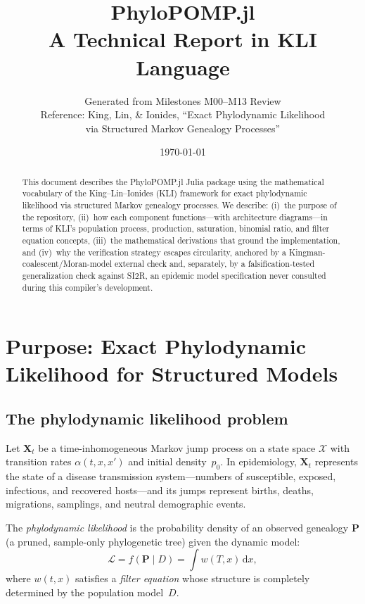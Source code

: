 \documentclass[11pt,leqno]{article}
\title{\vspace{-1.5cm}
  \textbf{PhyloPOMP.jl} \\[4pt]
  \large A Technical Report in KLI Language}
\author{Generated from Milestones M00--M13 Review \\[2pt]
  \small Reference: King, Lin, \& Ionides,
  ``Exact Phylodynamic Likelihood \\
  \small via Structured Markov Genealogy Processes''}
\date{\today}
\newcommand{\Xr}{\mathbf{X}}        %
\renewcommand{\Pr}{\mathbf{P}}      %
\newcommand{\Xspace}{\mathcal{X}}   %
\newcommand{\dd}[1]{\,\mathrm{d}{#1}}
\newcommand{\lik}{\mathcal{L}}      %
\newcommand{\pkg}[1]{\textsf{#1}}
\theoremstyle{plain}
\theoremstyle{definition}
\begin{document}
\maketitle

\begin{abstract}
This document describes the \pkg{PhyloPOMP.jl} Julia package using the
mathematical vocabulary of the King--Lin--Ionides (KLI) framework for exact
phylodynamic likelihood via structured Markov genealogy processes.
We describe:
(i)~the purpose of the repository,
(ii)~how each component functions---with architecture diagrams---in terms of
KLI's population process, production, saturation, binomial ratio, and filter
equation concepts,
(iii)~the mathematical derivations that ground the implementation, and
(iv)~why the verification strategy escapes circularity, anchored by a
Kingman-coalescent/Moran-model external check and, separately, by a
falsification-tested generalization check against SI2R, an epidemic
model specification never consulted during this compiler's development.
\end{abstract}

\tableofcontents
\vspace{1em}

\section{Purpose: Exact Phylodynamic Likelihood for Structured Models}
\label{sec:purpose}

\subsection{The phylodynamic likelihood problem}

Let $\Xr_t$ be a time-inhomogeneous Markov jump process on a state space
$\Xspace$ with transition rates $\alpha(t,x,x')$ and initial density~$p_0$.
In epidemiology, $\Xr_t$ represents the state of a disease transmission
system---numbers of susceptible, exposed, infectious, and recovered hosts---and
its jumps represent births, deaths, migrations, samplings, and neutral
demographic events.

The \emph{phylodynamic likelihood} is the probability density of an observed
genealogy $\Pr$ (a pruned, sample-only phylogenetic tree) given the dynamic
model:
\begin{equation}\label{eq:phylo-lik}
  \lik = f(\Pr \mid D) = \int w(T,x) \dd{x},
\end{equation}
where $w(t,x)$ satisfies a \emph{filter equation} whose structure is
completely determined by the population model~$D$.
\end{document}

